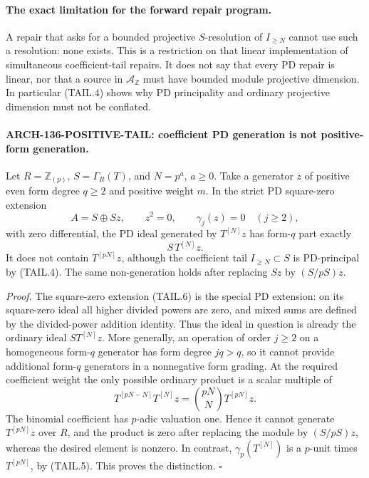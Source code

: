 \paragraph{The exact limitation for the forward repair program.}
A repair that asks for a bounded projective \(S\)-resolution of
\(I_{\ge N}\) cannot use such a resolution: none exists.
This is a restriction on that linear implementation of simultaneous
coefficient-tail repairs. It does not say that every PD repair is
linear, nor that a source in \(\mathcal A_{\mathbb Z}\) must have
bounded module projective dimension. In particular (TAIL.4) shows why
PD principality and ordinary projective dimension must not be
conflated.

\paragraph{ARCH-136-POSITIVE-TAIL: coefficient PD generation is not positive-form generation.}
Let \(R=\mathbb Z_{(p)}\), \(S=\Gamma_R(T)\), and
\(N=p^a\), \(a\geq0\). Take a generator \(z\) of positive even
form degree \(q\geq2\) and positive weight \(m\). In the strict
PD square-zero extension
\[
             A=S\oplus Sz,
       \qquad z^2=0,\qquad \gamma_j(z)=0\quad(j\geq2),
 \tag{TAIL.6}
\]
with zero differential, the PD ideal generated by \(T^{[N]}z\)
has form-\(q\) part exactly
\[
                         S\,T^{[N]}z.
 \tag{TAIL.7}
\]
It does not contain \(T^{[pN]}z\), although the coefficient
tail \(I_{\ge N}\subset S\) is PD-principal by (TAIL.4).
The same non-generation holds after replacing \(Sz\) by
\((S/pS)z\).

\emph{Proof.}
The square-zero extension (TAIL.6) is the special PD extension:
on its square-zero ideal all higher divided powers are zero,
and mixed sums are defined by the divided-power addition identity.
Thus the ideal in question is already the ordinary ideal
\(S T^{[N]}z\). More generally, an operation of order \(j\geq2\)
on a homogeneous form-\(q\) generator has form degree \(jq>q\),
so it cannot provide additional form-\(q\) generators in a
nonnegative form grading.
At the required coefficient weight the only possible ordinary
product is a scalar multiple of
\[
 T^{[pN-N]}T^{[N]}z
       =\binom{pN}{N}T^{[pN]}z.
 \tag{TAIL.8}
\]
The binomial coefficient has \(p\)-adic valuation one. Hence it
cannot generate \(T^{[pN]}z\) over \(R\), and the product is
zero after replacing the module by \((S/pS)z\), whereas the
desired element is nonzero. In contrast,
\(\gamma_p(T^{[N]})\) is a \(p\)-unit times \(T^{[pN]}\),
by (TAIL.5). This proves the distinction. \(\square\)

